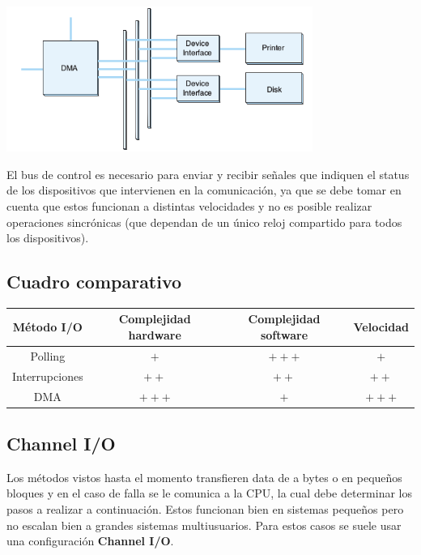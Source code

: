 \begin{center}
	\includegraphics[width=10cm, keepaspectratio=yes]{imagenes/dmabus.png}
\end{center}

El bus de control es necesario para enviar y recibir señales que indiquen el status de los dispositivos que intervienen en la comunicación, ya que se debe tomar en cuenta que estos funcionan a distintas velocidades y no es posible realizar operaciones sincrónicas (que dependan de un único reloj compartido para todos los dispositivos).

\subsection{Cuadro comparativo}
\begin{center}
	\begin{center}
		\begin{tabular}{|c|c|c|c|}
			\hline
			Método I/O & Complejidad hardware & Complejidad software & Velocidad\\ 
			\hline \hline 
			Polling &  $+$  & $+++$ & $+$ \\
			Interrupciones &  $++$  & $++$ & $++$ \\
			DMA &  $+++$  & $+$ & $+++$ \\
			\hline
		\end{tabular}
	\end{center}
\end{center}

\subsection{Channel I/O}
Los métodos vistos hasta el momento transfieren data de a bytes o en pequeños bloques y en el caso de falla se le comunica a la CPU, la cual debe determinar los pasos a realizar a continuación. Estos funcionan bien en sistemas pequeños pero no escalan bien a grandes sistemas multiusuarios. Para estos casos se suele usar una configuración \textbf{Channel I/O}.

